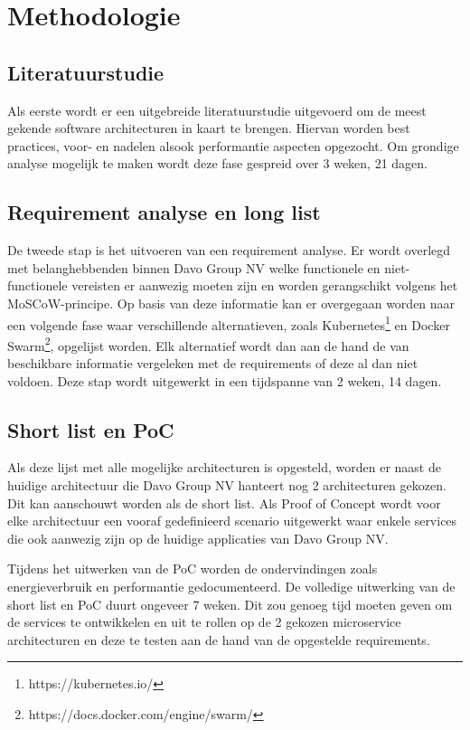 \section{Methodologie}%
\label{sec:methodologie}
\subsection{Literatuurstudie}
Als eerste wordt er een uitgebreide literatuurstudie uitgevoerd om de meest gekende software architecturen in kaart te brengen. Hiervan worden best practices, voor- en nadelen alsook performantie aspecten opgezocht. Om grondige analyse mogelijk te maken wordt deze fase gespreid over 3 weken, 21 dagen.

\subsection{Requirement analyse en long list}
De tweede stap is het uitvoeren van een requirement analyse. Er wordt overlegd met belanghebbenden binnen Davo Group NV welke functionele en niet-functionele vereisten er aanwezig moeten zijn en worden gerangschikt volgens het MoSCoW-principe. Op basis van deze informatie kan er overgegaan worden naar een volgende fase waar verschillende alternatieven, zoals Kubernetes\footnote{https://kubernetes.io/} en Docker Swarm\footnote{https://docs.docker.com/engine/swarm/}, opgelijst worden. Elk alternatief wordt dan aan de hand de van beschikbare informatie vergeleken met de requirements of deze al dan niet voldoen. Deze stap wordt uitgewerkt in een tijdspanne van 2 weken, 14 dagen.
\subsection{Short list en PoC}
Als deze lijst met alle mogelijke architecturen is opgesteld, worden er naast de huidige architectuur die Davo Group NV hanteert nog 2 architecturen gekozen. Dit kan aanschouwt worden als de short list. Als Proof of Concept wordt voor elke architectuur een vooraf gedefinieerd scenario uitgewerkt waar enkele services die ook aanwezig zijn op de huidige applicaties van Davo Group NV. 

Tijdens het uitwerken van de PoC worden de ondervindingen zoals energieverbruik en performantie gedocumenteerd. De volledige uitwerking van de short list en PoC duurt ongeveer 7 weken. Dit zou genoeg tijd moeten geven om de services te ontwikkelen en uit te rollen op de 2 gekozen microservice architecturen en deze te testen aan de hand van de opgestelde requirements.

